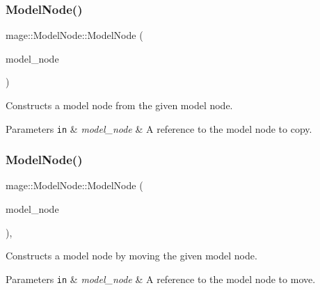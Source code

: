 \subsubsection{\texorpdfstring{Model\+Node()}{ModelNode()}\hspace{0.1cm}{\footnotesize\ttfamily [3/4]}}
{\footnotesize\ttfamily mage\+::\+Model\+Node\+::\+Model\+Node (\begin{DoxyParamCaption}\item[{const \hyperlink{classmage_1_1_model_node}{Model\+Node} \&}]{model\+\_\+node }\end{DoxyParamCaption})}

Constructs a model node from the given model node.


\begin{DoxyParams}[1]{Parameters}
\mbox{\tt in}  & {\em model\+\_\+node} & A reference to the model node to copy. \\
\hline
\end{DoxyParams}
\hypertarget{classmage_1_1_model_node_a1e900787d894c25ffb7e71456e44c03b}{}\label{classmage_1_1_model_node_a1e900787d894c25ffb7e71456e44c03b} 
\subsubsection{\texorpdfstring{Model\+Node()}{ModelNode()}\hspace{0.1cm}{\footnotesize\ttfamily [4/4]}}
{\footnotesize\ttfamily mage\+::\+Model\+Node\+::\+Model\+Node (\begin{DoxyParamCaption}\item[{\hyperlink{classmage_1_1_model_node}{Model\+Node} \&\&}]{model\+\_\+node }\end{DoxyParamCaption})\hspace{0.3cm}{\ttfamily [default]}, {\ttfamily [noexcept]}}

Constructs a model node by moving the given model node.


\begin{DoxyParams}[1]{Parameters}
\mbox{\tt in}  & {\em model\+\_\+node} & A reference to the model node to move. \\
\hline
\end{DoxyParams}
\hypertarget{classmage_1_1_model_node_a131c0062a1bed3d29fade27e602bec44}{}\label{classmage_1_1_model_node_a131c0062a1bed3d29fade27e602bec44} 
